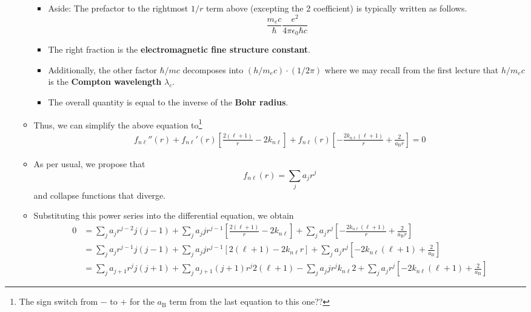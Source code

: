 \documentclass[../notes.tex]{subfiles}
\begin{document}
\begin{itemize}
\begin{itemize}
\begin{equation*}
        \end{equation*}
        \begin{itemize}
            \item Aside: The prefactor to the rightmost $1/r$ term above (excepting the 2 coefficient) is typically written as follows.
            \begin{equation*}
                \frac{m_ec}{\hbar}\frac{e^2}{4\pi\epsilon_0\hbar c}
            \end{equation*}
            \item The right fraction is the \textbf{electromagnetic fine structure constant}.
            \item Additionally, the other factor $\hbar/mc$ decomposes into $(h/m_ec)\cdot(1/2\pi)$ where we may recall from the first lecture that $h/m_ec$ is the \textbf{Compton wavelength} $\lambda_c$.
            \item The overall quantity is equal to the inverse of the \textbf{Bohr radius}.
        \end{itemize}
        \item Thus, we can simplify the above equation to\footnote{The sign switch from $-$ to $+$ for the $a_\text{B}$ term from the last equation to this one??}
        \begin{align*}
            f_{n\ell}''(r)+f_{n\ell}'(r)\left[ \frac{2(\ell+1)}{r}-2k_{n\ell} \right]+f_{n\ell}(r)\left[ -\frac{2k_{n\ell}(\ell+1)}{r}+\frac{2}{a_\text{B}r} \right] = 0
        \end{align*}
        \item As per usual, we propose that
        \begin{equation*}
            f_{n\ell}(r) = \sum_ja_jr^j
        \end{equation*}
        and collapse functions that diverge.
        \item Substituting this power series into the differential equation, we obtain
        \begin{align*}
            0 &= \sum_ja_jr^{j-2}j(j-1)+\sum_ja_jjr^{j-1}\left[ \frac{2(\ell+1)}{r}-2k_{n\ell} \right]+\sum_ja_jr^j\left[ -\frac{2k_{n\ell}(\ell+1)}{r}+\frac{2}{a_\text{B}r} \right]\\
            &= \sum_ja_jr^{j-1}j(j-1)+\sum_ja_jjr^{j-1}[2(\ell+1)-2k_{n\ell}r]+\sum_ja_jr^j\left[ -2k_{n\ell}(\ell+1)+\frac{2}{a_\text{B}} \right]\\
            &= \sum_ja_{j+1}r^jj(j+1)+\sum_ja_{j+1}(j+1)r^j2(\ell+1)-\sum_ja_jjr^jk_{n\ell}2+\sum_ja_jr^j\left[ -2k_{n\ell}(\ell+1)+\frac{2}{a_\text{B}} \right]

\end{align*}
\end{itemize}
\end{itemize}
\end{document}
